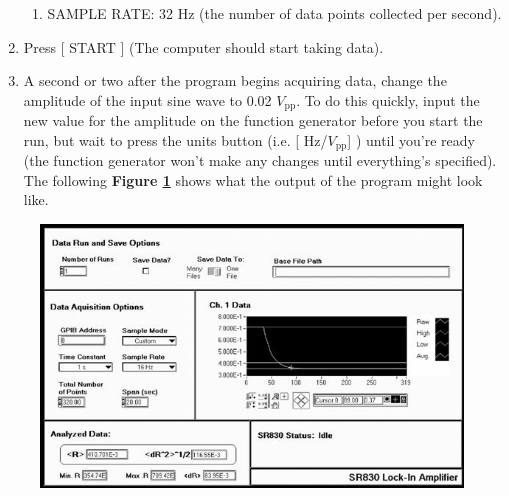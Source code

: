 \documentclass{../lab}
\begin{document}
\begin{enumerate}
\begin{enumerate}
        \item SAMPLE RATE: 32 Hz (the number of data points collected per second).

    \end{enumerate}

    \item Press [ START ] (The computer should start taking data).

    \item A second or two after the program begins acquiring data, change the amplitude of the input sine wave to 0.02 $V_\text{pp}$. To do this quickly, input the new value for the amplitude on the function generator before you start the run, but wait to press the units button (i.e. [ Hz/$V_\text{pp}$] ) until you're ready (the function generator won't make any changes until everything's specified). The following \textbf{Figure \ref{fig:LLSimage013}} shows what the output of the program might look like.

\end{enumerate}


\begin{figure}[h]
    \centering
    \href{http://experimentationlab.berkeley.edu/sites/default/files/images/LLSimage013.jpg}{\includegraphics[width=0.6\linewidth]{images/LLSimage013.jpg}}
    \caption{}
    \label{fig:LLSimage013}
\end{figure}
\end{document}
